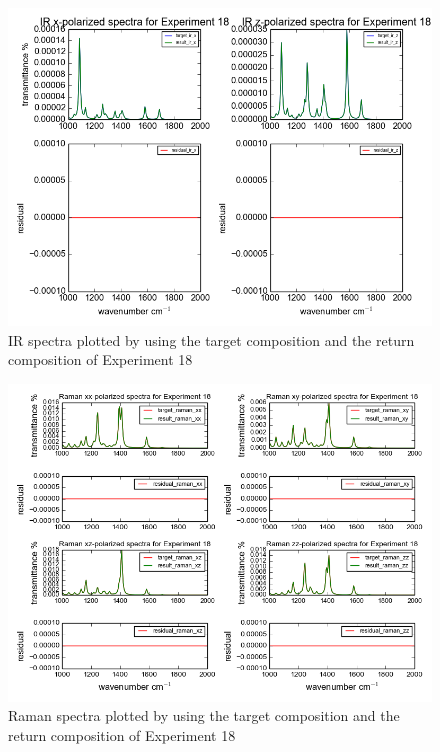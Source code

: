 \begin{figure}[!ht] 
\centering
\includegraphics[scale=0.7]{Figures/chapter4_result_target_plotting_500datapoint_ir.png}
\caption{IR spectra plotted by using the target composition and the return composition of Experiment 18} \label{fig:4.5}
\end{figure}

\begin{figure}[!ht] 
\centering
\includegraphics[scale=0.7]{Figures/chapter4_result_target_plotting_500datapoint_raman.png}
\caption{Raman spectra plotted by using the target composition and the return composition of Experiment 18} \label{fig:4.6}
\end{figure}

